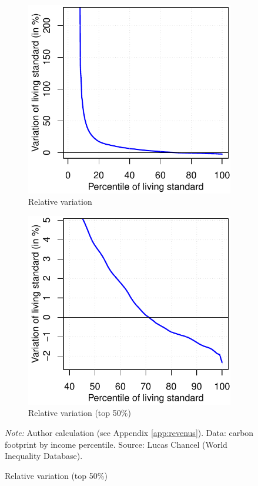\documentclass[a5paper,english,openany]{memoir}
\begin{document}
\begin{figure}[h!]
\begin{subfigure}{.5\textwidth}
\end{subfigure}
\quad \quad
\begin{subfigure}{.5\textwidth}
  \caption[]{Relative variation}\label{fig:evol_distr_c}
  \includegraphics[width=\textwidth]{../figures/policies/gcp_var_rev_en.pdf}
\end{subfigure} \quad
\begin{subfigure}{.5\textwidth}
  \caption[]{Relative variation (top 50\%)}\label{fig:evol_distr_d}
  \includegraphics[width=\textwidth]{../figures/policies/gcp_var_rev_rich_only_en.pdf}
\end{subfigure}
{\footnotesize \textit{Note:} Author calculation
(see %
Appendix \ref{app:revenus}). Data: carbon footprint by income percentile. Source: Lucas Chancel (World Inequality Database).}
\end{figure}
\end{document}
